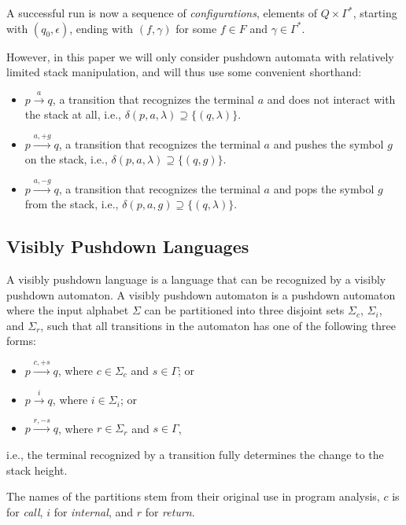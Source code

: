 \documentclass[acmsmall,review,anonymous]{acmart}\settopmatter{printfolios=true,printccs=false,printacmref=false}
\newcommand{\T}{\Sigma} %
\begin{document}
A successful run is now a sequence of \emph{configurations}, elements of $Q \times \Gamma^{*}$, starting with $(q_0, \epsilon)$, ending with $(f, \gamma)$ for some $f \in F$ and $\gamma \in \Gamma^{*}$.

However, in this paper we will only consider pushdown automata with relatively limited stack manipulation, and will thus use some convenient shorthand:

\begin{itemize}
\item $p \xrightarrow{a} q$, a transition that recognizes the terminal $a$ and does not interact with the stack at all, i.e., $\delta(p, a, \lambda) \supseteq \{(q, \lambda)\}$.
\item $p \xrightarrow{a, +g} q$, a transition that recognizes the terminal $a$ and pushes the symbol $g$ on the stack, i.e., $\delta(p, a, \lambda) \supseteq \{(q, g)\}$.
\item $p \xrightarrow{a, -g} q$, a transition that recognizes the terminal $a$ and pops the symbol $g$ from the stack, i.e., $\delta(p, a, g) \supseteq \{(q, \lambda)\}$.
\end{itemize}

\subsection{Visibly Pushdown Languages} \label{sec:preliminaries-vpls}

A visibly pushdown language \cite{alurVisiblyPushdownLanguages2004} is a language that can be recognized by a visibly pushdown automaton. A visibly pushdown automaton is a pushdown automaton where the input alphabet $\T$ can be partitioned into three disjoint sets $\T_c$, $\T_i$, and $\T_r$, such that all transitions in the automaton has one of the following three forms:

\begin{itemize}
\item $p \xrightarrow{c, +s} q$, where $c \in \T_c$ and $s \in \Gamma$; or
\item $p \xrightarrow{i} q$, where $i \in \T_i$; or
\item $p \xrightarrow{r, -s} q$, where $r \in \T_r$ and $s \in \Gamma$,
\end{itemize}

\noindent i.e., the terminal recognized by a transition fully determines the change to the stack height.

The names of the partitions stem from their original use in program analysis, $c$ is for \emph{call}, $i$ for \emph{internal}, and $r$ for \emph{return}.
\end{document}
